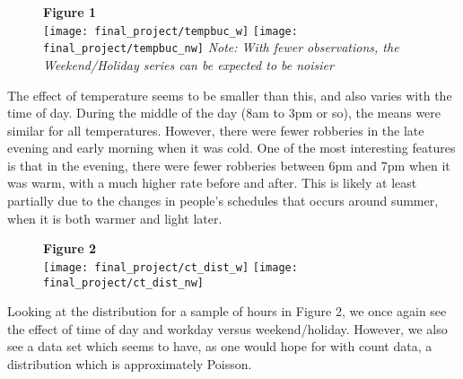 \documentclass[11pt]{article}
\theoremstyle{definition}
\begin{document}
\begin{figure}[h]
    {\bf Figure 1} \\
    \texttt{[image: final\_project/tempbuc\_w]}
    \texttt{[image: final\_project/tempbuc\_nw]}
    \textit{Note: With fewer observations, the Weekend/Holiday series can be expected to be noisier}
\end{figure}
The effect of temperature seems to be smaller than this, and also varies with the time of day. During the middle of the day (8am to 3pm or so), the means were similar for all temperatures. However, there were fewer robberies in the late evening and early morning when it was cold. One of the most interesting features is that in the evening, there were fewer robberies between 6pm and 7pm when it was warm, with a much higher rate before and after. This is likely at least partially due to the changes in people's schedules that occurs around summer, when it is both warmer and light later.  \par
\begin{figure}[h]
    {\bf Figure 2} \\
    \texttt{[image: final\_project/ct\_dist\_w]}
    \texttt{[image: final\_project/ct\_dist\_nw]}
\end{figure}
Looking at the distribution for a sample of hours in Figure 2, we once again see the effect of time of day and workday versus weekend/holiday. However, we also see a data set which seems to have, as one would hope for with count data, a distribution which is approximately Poisson.
\end{document}
